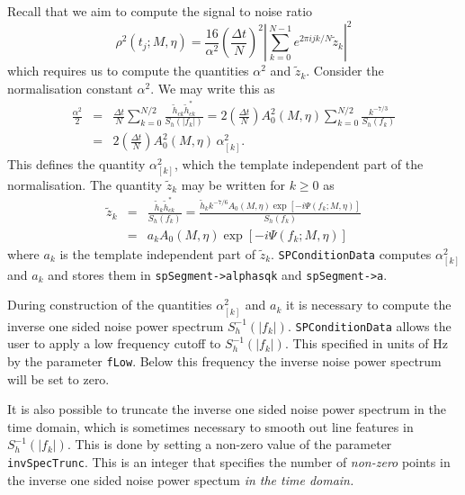 Recall that we aim to compute the signal to noise ratio
\begin{equation}
\rho^2(t_j; M, \eta) = 
\frac{16}{\alpha^2} \left(\frac{\Delta t}{N} \right)^2 
  \left| \sum_{k=0}^{N-1} e^{2\pi ijk/N} \tilde{z}_k \right|^2
\label{e:rhosq}
\end{equation}
which requires us to compute the quantities $\alpha^2$ and $\tilde{z}_k$.
Consider the normalisation constant $\alpha^2$. We may write this as 
\begin{eqnarray}
\nonumber
\frac{\alpha^2}{2} 
&=& \frac{\Delta t}{N} 
  \sum_{k=0}^{N/2} \frac{\tilde{h}_{ck}\tilde{h}^\ast_{ck}}{S_h(|f_k|)}
= 2 \left(\frac{\Delta t}{N}\right)
   A_0^2(M,\eta) \sum_{k=0}^{N/2} \frac{k^{-7/3}}{S_h(f_k)} \\
&=& 2 \left(\frac{\Delta t}{N}\right) A_0^2(M,\eta)\, \alpha_{[k]}^2.
\end{eqnarray}
This defines the quantity $\alpha_{[k]}^2$, which the template independent
part of the normalisation.
The quantity $\tilde{z}_k$ may be written for $k\ge 0$ as
\begin{eqnarray}
\tilde{z}_k 
&=& \frac{\tilde{h}_k \tilde{h}^\ast_{ck}}{S_h(f_k)}
= \frac{\tilde{h}_k k^{-7/6} A_0(M,\eta) \exp\left[-i\Psi(f_k;M,\eta)\right]}
         {S_h(f_k)} \\
&=& a_k  A_0(M,\eta) \exp\left[-i\Psi(f_k;M,\eta)\right] 
\end{eqnarray}
where $a_k$ is the template independent part of $\tilde{z}_k$.
\verb|SPConditionData| computes $\alpha^2_{[k]}$ and $a_k$ and stores 
them in \verb|spSegment->alphasqk| and \verb|spSegment->a|.

During construction of the quantities $\alpha^2_{[k]}$ and $a_k$ 
it is necessary to compute the inverse one sided noise power spectrum
$S_h^{-1}(|f_k|)$. \verb|SPConditionData| allows the user to apply a
low frequency cutoff to $S_h^{-1}(|f_k|)$. This specified in units of
Hz by the parameter \verb|fLow|. Below this frequency the inverse
noise power spectrum will be set to zero.

It is also possible to truncate the inverse one sided noise power 
spectrum in the time domain, which is sometimes necessary to smooth
out line features in $S_h^{-1}(|f_k|)$. This is done by setting a
non-zero value of the parameter \verb|invSpecTrunc|. This is an 
integer that specifies the number of \emph{non-zero} points in the
inverse one sided noise power spectum \emph{in the time domain.}

